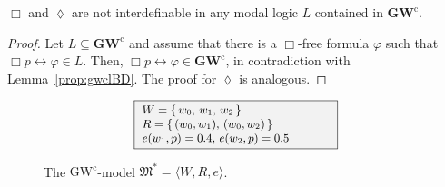 \documentclass[copyright,creativecommons]{eptcs}
\newcommand{\GWCL}{\mathbf{GW}^\mathrm{c}}
\newcommand{\GWCM}{\mbox{$\mathrm{GW}^\mathrm{c}$}}
\newcommand{\tto}{\leftrightarrow}
\newcommand{\Diam}{\lozenge}
\newcommand{\stru}[1]{\langle #1 \rangle} %
\newcommand{\M}{\mathfrak{M}}
\begin{document}
\begin{proposition}\label{prop:defBD}
  $\Box$ and $\Diam$ are not interdefinable in any modal logic $L$
  contained in $\GWCL$.
\end{proposition}  

\begin{proof}
  Let $L\subseteq \GWCL$ and assume
  that  there is
  a $\Box$-free formula $\varphi$ such that $\Box p\tto\varphi\in
  L$. Then, $\Box p\tto\varphi\in \GWCL$,
  in contradiction with Lemma~\ref{prop:gwclBD}.  The proof for
  $\Diam$ is analogous.
\end{proof}

\begin{figure}[t]
  \centering
  \begin{minipage}{0.45\linewidth}
  \end{minipage}
  \begin{minipage}{0.5\linewidth}
    \[\small
    \begin{array}{l}
      \fcolorbox{black}{gray!10}{
        \begin{minipage}{16em}\small
          $W=\{\,w_0,\,w_1,\,w_2\,\}$
          \\
          $R =\{\,(w_0,w_1),\,(w_0,w_2)\,\}$
          \\
          $e(w_1,p) = 0.4,\,e(w_2,p) = 0.5$  
        \end{minipage}
      } %
    \end{array}
    \]
  \end{minipage}
  \caption{The \GWCM-model  $\M^\ast=\stru{W,R,e}$.}
  \label{fig:ind}
\end{figure}
  
\end{document}

